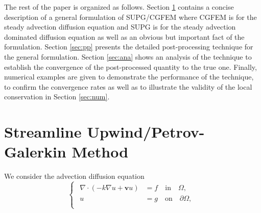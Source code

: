 \documentclass[times]{nlaauth}
\numberwithin{equation}{section}
\begin{document}
The rest of the paper is organized as follows. Section \ref{sec:supg} contains a concise description of a general formulation of SUPG/CGFEM where CGFEM is for the steady advection diffusion equation and SUPG is for the steady advection dominated diffusion equation as well as an obvious but important fact of the formulation.
Section \ref{sec:pp} presents the detailed post-processing technique for the general formulation. 
Section \ref{sec:ana} shows an analysis of the technique to establish the convergence of the post-processed quantity to the true one. Finally, numerical examples are given to demonstrate the performance of the technique, to confirm the convergence rates as well as to illustrate the validity of the local conservation in Section \ref{sec:num}.

\section{Streamline Upwind/Petrov-Galerkin Method} \label{sec:supg}
We consider the advection diffusion equation
\begin{equation}\label{pde}
\begin{cases}
\begin{aligned}
 \nabla \cdot ( -k\nabla u + \boldsymbol{v} u ) & =f \quad \text{in} \quad \Omega, \\
u&= g \quad \text{on} \quad \partial\Omega, \\
\end{aligned}
\end{cases}
\end{equation}
\end{document}
